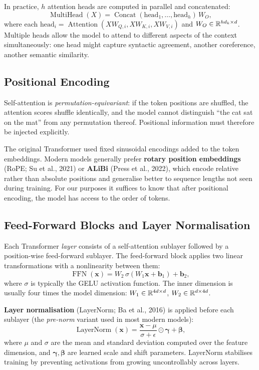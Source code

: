 In practice, $h$ attention heads are computed in parallel and concatenated:
\[
\operatorname{MultiHead}(X) = \operatorname{Concat}(\mathrm{head}_1, \ldots, \mathrm{head}_h)\,W_O,
\]
where each $\mathrm{head}_i = \operatorname{Attention}(XW_{Q,i}, XW_{K,i}, XW_{V,i})$ and $W_O \in \mathbb{R}^{hd_k \times d}$. Multiple heads allow the model to attend to different aspects of the context simultaneously: one head might capture syntactic agreement, another coreference, another semantic similarity.

\subsection{Positional Encoding}

Self-attention is \emph{permutation-equivariant}: if the token positions are shuffled, the attention scores shuffle identically, and the model cannot distinguish ``the cat sat on the mat'' from any permutation thereof. Positional information must therefore be injected explicitly.

The original Transformer used fixed sinusoidal encodings added to the token embeddings. Modern models generally prefer \textbf{rotary position embeddings} (RoPE; Su et al., 2021) or \textbf{ALiBi} (Press et al., 2022), which encode relative rather than absolute positions and generalise better to sequence lengths not seen during training. For our purposes it suffices to know that after positional encoding, the model has access to the order of tokens.

\subsection{Feed-Forward Blocks and Layer Normalisation}

Each Transformer \emph{layer} consists of a self-attention sublayer followed by a position-wise feed-forward sublayer. The feed-forward block applies two linear transformations with a nonlinearity between them:
\[
\operatorname{FFN}(\mathbf{x}) = W_2\,\sigma(W_1 \mathbf{x} + \mathbf{b}_1) + \mathbf{b}_2,
\]
where $\sigma$ is typically the GELU activation function. The inner dimension is usually four times the model dimension: $W_1 \in \mathbb{R}^{4d \times d}$, $W_2 \in \mathbb{R}^{d \times 4d}$.

\textbf{Layer normalisation} (LayerNorm; Ba et al., 2016) is applied before each sublayer (the \emph{pre-norm} variant used in most modern models):
\[
\operatorname{LayerNorm}(\mathbf{x}) = \frac{\mathbf{x} - \mu}{\sigma + \epsilon} \odot \boldsymbol{\gamma} + \boldsymbol{\beta},
\]
where $\mu$ and $\sigma$ are the mean and standard deviation computed over the feature dimension, and $\boldsymbol{\gamma}, \boldsymbol{\beta}$ are learned scale and shift parameters. LayerNorm stabilises training by preventing activations from growing uncontrollably across layers.

